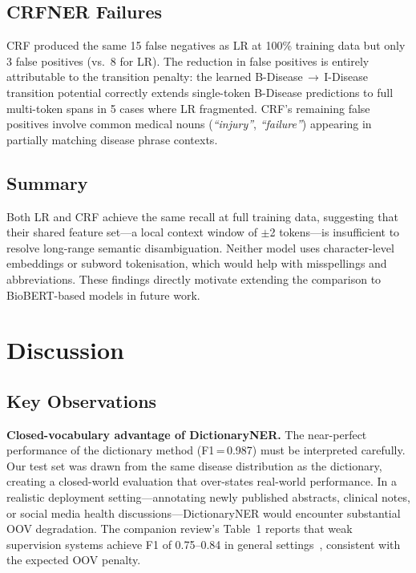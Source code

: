 \documentclass[sigconf,nonacm]{acmart}
\begin{document}
\subsection{CRFNER Failures}

CRF produced the same 15 false negatives as LR at 100\% training data but only 3 false positives (vs.\ 8 for LR). The reduction in false positives is entirely attributable to the transition penalty: the learned B-Disease\,$\rightarrow$\,I-Disease transition potential correctly extends single-token B-Disease predictions to full multi-token spans in 5 cases where LR fragmented. CRF's remaining false positives involve common medical nouns (\emph{``injury''}, \emph{``failure''}) appearing in partially matching disease phrase contexts.

\subsection{Summary}

Both LR and CRF achieve the same recall at full training data, suggesting that their shared feature set---a local context window of $\pm$2 tokens---is insufficient to resolve long-range semantic disambiguation. Neither model uses character-level embeddings or subword tokenisation, which would help with misspellings and abbreviations. These findings directly motivate extending the comparison to BioBERT-based models in future work.

\section{Discussion}

\subsection{Key Observations}

\textbf{Closed-vocabulary advantage of DictionaryNER.}
The near-perfect performance of the dictionary method (F1\,=\,0.987) must be interpreted carefully. Our test set was drawn from the same disease distribution as the dictionary, creating a closed-world evaluation that over-states real-world performance. In a realistic deployment setting---annotating newly published abstracts, clinical notes, or social media health discussions---DictionaryNER would encounter substantial OOV degradation. The companion review's Table~1 reports that weak supervision systems achieve F1 of 0.75--0.84 in general settings~\cite{sutariya2026review}, consistent with the expected OOV penalty.
\end{document}

